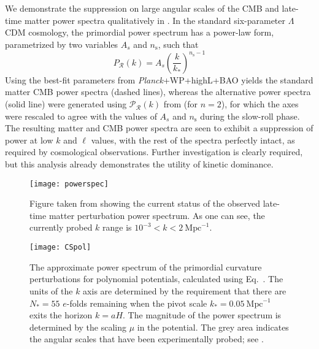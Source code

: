 We demonstrate the suppression on large angular scales of the CMB and
late-time matter power spectra qualitatively in .
In the standard six-parameter $\Lambda$CDM cosmology, the primordial
power spectrum has a power-law form, parametrized by two variables
$A_s$ and $n_\mathrm{s}$, such that
%
\begin{equation}
	P_\mathcal{R}(k) = A_s\left(\frac{k}{k_*}\right)^{n_\mathrm{s}-1}
\end{equation}
%
Using the best-fit parameters from {\em Planck}+WP+highL+BAO
\citep{planck_collaboration_planck_2013} yields the standard matter
CMB power spectra (dashed lines), whereas the alternative power
spectra (solid line) were generated using $\mathcal{P}_\mathcal{R}(k)$
from  (for $n=2$), for which the axes were
rescaled to agree with the values of $A_s$ and $n_\mathrm{s}$ during
the slow-roll phase. The resulting matter and CMB power spectra are
seen to exhibit a suppression of power at low $k$ and $\ell$ values,
with the rest of the spectra perfectly intact, as required by
cosmological observations.  Further investigation is clearly required,
but this analysis already demonstrates the utility of kinetic
dominance.

%
\begin{figure}
  \centering
  \texttt{[image: powerspec]}
  \caption{Figure taken from \protect\citet{hlozek_atacama_2012}
  showing the current status of the observed late-time matter
  perturbation power spectrum. As one can see, the currently probed
  $k$ range is $10^{-3}<k<2\:\mathrm{Mpc}^{-1}$.  }
  \label{fig:experimental_power_spectrum}
\end{figure}
%

%
\begin{figure}
  \texttt{[image: CSpol]}
  \caption{The approximate power spectrum of the primordial curvature
    perturbations for polynomial potentials, calculated using Eq.\ 
    \protect{}. The units of the $k$
    axis are determined by the requirement that there are $N_*=55$
    $e$-folds remaining when the pivot scale
    $k_*=0.05\:\mathrm{Mpc}^{-1}$ exits the horizon $k=aH$. The
    magnitude of the power spectrum is determined by the scaling $\mu$
    in the potential. The grey area indicates the angular scales that
    have been experimentally probed; see
    \protect{}.  }
  \label{fig:figure_CSpol}
\end{figure}
%

